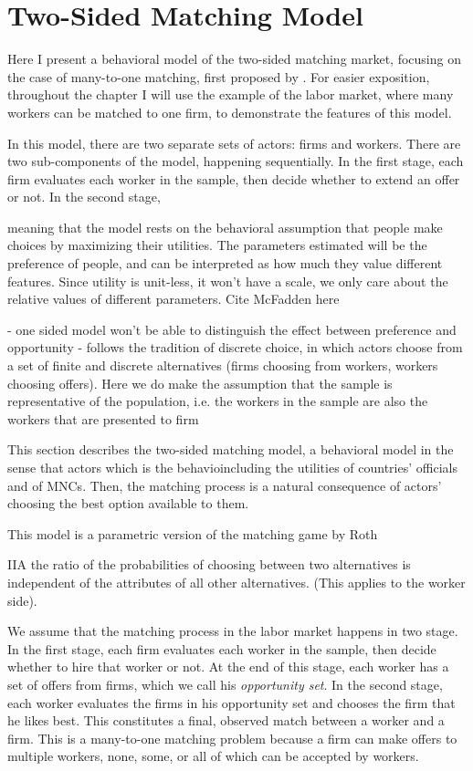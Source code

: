 \chapter{Two-Sided Matching Model}
\label{chap:model}

Here I present a behavioral model of the two-sided matching market, focusing on
the case of many-to-one matching, first proposed by \cite{Logan1996}. For easier exposition, throughout the chapter
I will use the example of the labor market, where many workers can be matched to
one firm, to demonstrate the features of this model.

In this model, there are two separate sets of actors: firms and workers. There
are two sub-components of the model, happening sequentially. In the first stage, each firm
evaluates each worker in the sample, then decide whether to extend an offer or
not. In the second stage, 

meaning that the model rests on the behavioral assumption that
people make choices by maximizing their utilities. The parameters estimated will
be the preference of people, and can be interpreted as how much they value
different features. Since utility is unit-less, it won't have a scale, we only
care about the relative values of different parameters.
Cite McFadden here

- one sided model won't be able to distinguish the effect between preference and opportunity
- follows the tradition of discrete choice, in which actors choose from a set of
finite and discrete alternatives (firms choosing from workers, workers choosing
offers). Here we do make the assumption that the sample is representative of the
population, i.e. the workers in the sample are also the workers that are
presented to firm

This section describes the two-sided matching model, a behavioral model in the
sense that actors which is the
behavioincluding the utilities of countries' officials and of MNCs. Then, the matching process is a natural consequence of actors' choosing the best option available to them.

This model is a parametric version of the matching game by Roth 


IIA the ratio of the probabilities of choosing between two alternatives is
independent of the attributes of all other alternatives. (This applies to the
worker side).

We assume that the matching process in the labor market happens in two stage.
In the first stage, each firm evaluates each worker in the sample, then
decide whether to hire that worker or not. At the end of this stage, each worker
has a set of offers from firms, which we call his \textit{opportunity
  set}. In the second stage, each worker evaluates the firms in his
opportunity set and chooses the firm that he likes best. This constitutes a
final, observed match between a worker and a firm. This is a many-to-one
matching problem because a firm can make offers to multiple
workers, none, some, or all of which can be accepted by workers.

